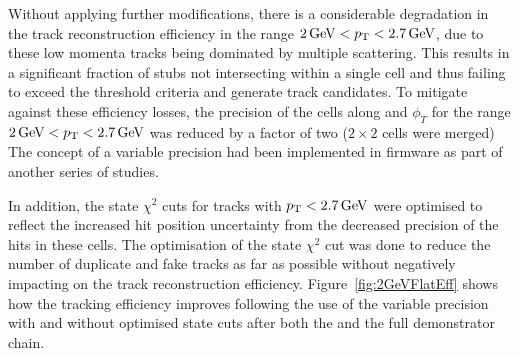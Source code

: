 Without applying further modifications, there is a considerable degradation in the track reconstruction efficiency in the range $2\,\text{Ge\hspace{-.08em}V} < p_{\mathrm{T}} < 2.7\,\text{Ge\hspace{-.08em}V}$, due to these low momenta tracks being dominated by multiple scattering.
This results in a significant fraction of stubs not intersecting within a single \HT cell and thus failing to exceed the threshold criteria and generate track candidates.
To mitigate against these efficiency losses, the precision of the \HT cells along \qpt and $\phi_{T}$ for the range $2\,\text{Ge\hspace{-.08em}V} < p_{\mathrm{T}} < 2.7\,\text{Ge\hspace{-.08em}V}$ was reduced by a factor of two (\ie $2 \times 2$ cells were merged)
The concept of a variable precision \HT had been implemented in firmware as part of another series of studies.

In addition, the \KF state $\chi^2$ cuts for tracks with $p_{\mathrm{T}} < 2.7\,\text{Ge\hspace{-.08em}V}$ were optimised to reflect the increased hit position uncertainty from the decreased precision of the hits in these \HT cells.
The optimisation of the \KF state $\chi^2$ cut was done to reduce the number of duplicate and fake tracks as far as possible without negatively impacting on the \HT track reconstruction efficiency.
Figure~\ref{fig:2GeVFlatEff} shows how the tracking efficiency improves following the use of the variable precision \HT with and without optimised \KF state cuts after both the \HT and the full demonstrator chain. 

